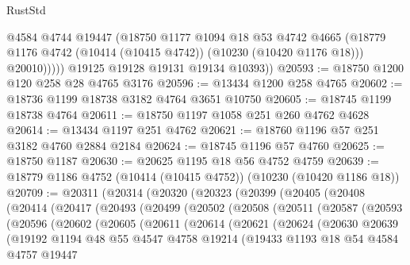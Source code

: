 \begin{lexlean}{RustStd}
\begin{coremodule}
                @4584
                @4744
                @19447
                (@18750
                  @1177
                  @1094
                  @18
                  @53
                  @4742
                  @4665
                  (@18779 @1176 @4742 (@10414 (@10415 @4742)) (@10230 (@10420 @1176 @18)))
                  @20010)))))
        @19125
        @19128
        @19131
        @19134
        @10393))
@20593 := @18750 @1200 @120 @258 @28 @4765 @3176
@20596 := @13434 @1200 @258 @4765
@20602 := @18736 @1199 @18738 @3182 @4764 @3651 @10750
@20605 := @18745 @1199 @18738 @4764
@20611 := @18750 @1197 @1058 @251 @260 @4762 @4628
@20614 := @13434 @1197 @251 @4762
@20621 := @18760 @1196 @57 @251 @3182 @4760 @2884 @2184
@20624 := @18745 @1196 @57 @4760
@20625 := @18750 @1187
@20630 := @20625 @1195 @18 @56 @4752 @4759
@20639 := @18779 @1186 @4752 (@10414 (@10415 @4752)) (@10230 (@10420 @1186 @18))
@20709 := @20311
    (@20314
      (@20320
        (@20323
          (@20399
            (@20405
              (@20408
                (@20414
                  (@20417
                    (@20493
                      (@20499
                        (@20502
                          (@20508
                            (@20511
                              (@20587
                                (@20593
                                  (@20596
                                    (@20602
                                      (@20605
                                        (@20611
                                          (@20614
                                            (@20621
                                              (@20624
                                                (@20630
                                                  @20639
                                                  (@19192
                                                    @1194
                                                    @48
                                                    @55
                                                    @4547
                                                    @4758
                                                    @19214
                                                    (@19433
                                                      @1193
                                                      @18
                                                      @54
                                                      @4584
                                                      @4757
                                                      @19447

\end{coremodule}
\end{lexlean}
